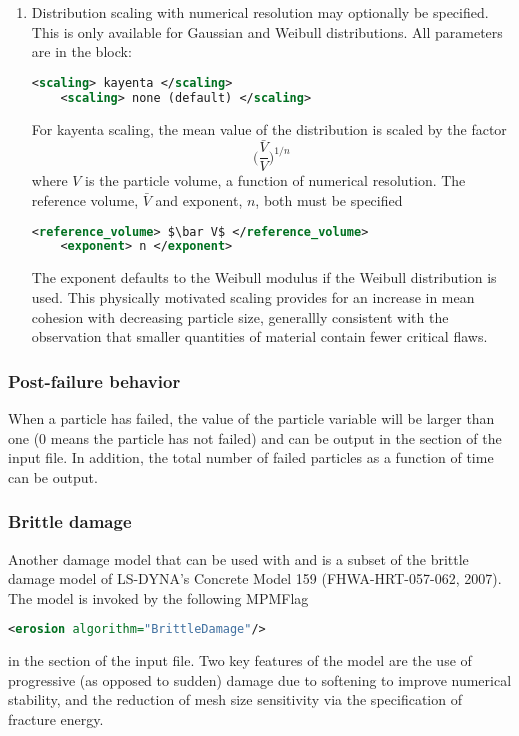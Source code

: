 \begin{enumerate}
\item {}
  Distribution scaling with numerical resolution may optionally be specified.  This is only 
  available for Gaussian and Weibull distributions.  All parameters are in the 
   block:
  \begin{lstlisting}[language=XML]
    <scaling> kayenta </scaling>
    <scaling> none (default) </scaling>
  \end{lstlisting}

  For kayenta scaling, the mean value of the distribution is scaled by the factor
  \begin{equation}
   \biggl(\frac{\bar V}{V}\biggr)^{1/n}
  \end{equation}
  where $V$ is the particle volume, a function of numerical resolution.  The reference volume, 
  $\bar V$ and exponent, $n$, both must be specified
  \begin{lstlisting}[language=XML]
    <reference_volume> $\bar V$ </reference_volume>
    <exponent> n </exponent>
  \end{lstlisting}
  The exponent defaults to the Weibull modulus if the Weibull distribution is used.  This physically
  motivated scaling provides for an increase in mean cohesion with decreasing particle size, generallly
  consistent with the observation that smaller quantities of material contain fewer critical flaws.
\end{enumerate}

\subsubsection{Post-failure behavior}
When a particle has failed, the value of the particle variable 
will be larger than one (0 means the particle has not failed) and can be output in the 
 section of the input file. In addition, the total number of failed particles as
a function of time  can be output. 

\subsubsection{Brittle damage}
Another damage model that can be used with  and
 is a subset of the brittle damage model of LS-DYNA's Concrete
 Model 159 (FHWA-HRT-057-062, 2007). The model is invoked by the following MPMFlag
\begin{lstlisting}[language=XML]
  <erosion algorithm="BrittleDamage"/>
\end{lstlisting}
in the  section of the input file. Two key features of the model are the use of
progressive (as opposed to sudden) damage due to softening to improve numerical stability, 
and the reduction of mesh size sensitivity via the specification of fracture energy. 

